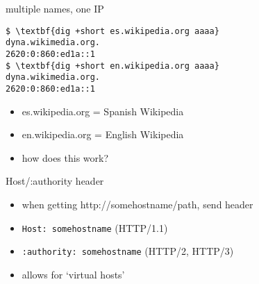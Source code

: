 \begin{frame}[fragile]{multiple names, one IP}
\begin{Verbatim}[commandchars=\\\{\}]
$ \textbf{dig +short es.wikipedia.org aaaa}
dyna.wikimedia.org.
2620:0:860:ed1a::1
$ \textbf{dig +short en.wikipedia.org aaaa}
dyna.wikimedia.org.
2620:0:860:ed1a::1
\end{Verbatim}
\begin{itemize}
\item es.wikipedia.org = Spanish Wikipedia
\item en.wikipedia.org = English Wikipedia
\item how does this work?
\end{itemize}
\end{frame}

\begin{frame}{Host/:authority header}
\begin{itemize}
\item when getting http://somehostname/path, send header
\item \texttt{Host: somehostname} (HTTP/1.1)
\item \texttt{:authority: somehostname} (HTTP/2, HTTP/3)
\vspace{.5cm}
\item allows for `virtual hosts'
\end{itemize}
\end{frame}
